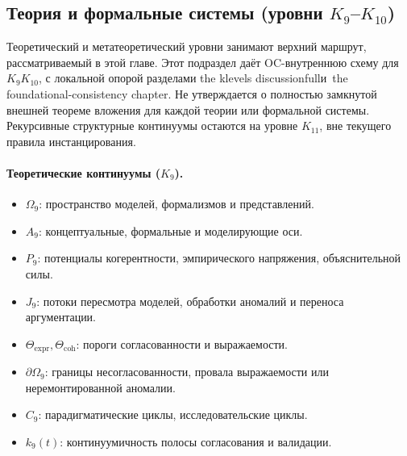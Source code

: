 \subsection{Теория и формальные системы (уровни
            \texorpdfstring{$K_9$}{K9}--\texorpdfstring{$K_{10}$}{K10})}

Теоретический и метатеоретический уровни занимают верхний маршрут, рассматриваемый
в этой главе. Этот подраздел даёт OC-внутреннюю схему для
\(K_9\)\textendash\(K_{10}\), с локальной опорой разделами
the klevels discussionfullи~the foundational-consistency chapter.
Не утверждается о полностью замкнутой внешней теореме вложения для каждой
теории или формальной системы. Рекурсивные структурные континуумы остаются на
уровне \(K_{11}\), вне текущего правила инстанцирования.

\paragraph{Теоретические континуумы (\texorpdfstring{$K_9$}{K9}).}
\begin{itemize}
  \item \(\Omega_9\): пространство моделей, формализмов и представлений.
  \item \(A_9\): концептуальные, формальные и моделирующие оси.
  \item \(P_9\): потенциалы когерентности, эмпирического напряжения,
        объяснительной силы.
  \item \(J_9\): потоки пересмотра моделей, обработки аномалий и
        переноса аргументации.
  \item \(\Theta_{\mathrm{expr}}, \Theta_{\mathrm{coh}}\): пороги
        согласованности и выражаемости.
  \item \(\partial\Omega_9\): границы несогласованности, провала
        выражаемости или неремонтированной аномалии.
  \item \(C_9\): парадигматические циклы, исследовательские циклы.
  \item \(k_9(t)\): континуумичность полосы согласования и валидации.
\end{itemize}

